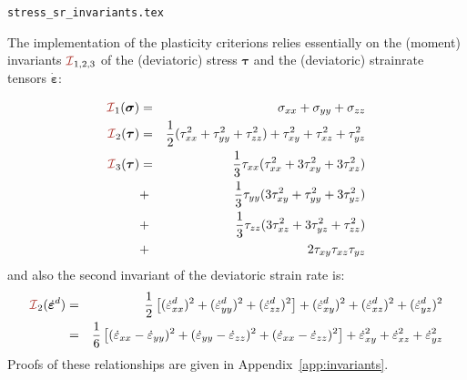 \begin{flushright} {\tiny {\color{gray} \tt stress\_sr\_invariants.tex}} \end{flushright}

The implementation of the plasticity criterions relies essentially 
on the (moment) invariants $\III_{1,2,3}$ of the (deviatoric) stress ${\bm \tau}$ 
and the (deviatoric) strainrate tensors $\dot{\bm \varepsilon}$:

\begin{eqnarray}
{\III}_1({\bm \sigma}) &=& \sigma_{xx}+\sigma_{yy}+\sigma_{zz}\\
{\III}_2({\bm \tau})   
&=&\frac{1}{2}(\tau_{xx}^2 + \tau_{yy}^2 + \tau_{zz}^2 ) + \tau_{xy}^2 + \tau_{xz}^2 + \tau_{yz}^2  \\
{\III}_3({\bm \tau}) 
&=& \frac{1}{3} \tau_{xx} (  \tau_{xx}^2 + 3 \tau_{xy}^2 + 3 \tau_{xz}^2  )     \nonumber\\
&+& \frac{1}{3} \tau_{yy} (3 \tau_{xy}^2 +   \tau_{yy}^2 + 3 \tau_{yz}^2  )     \nonumber\\
&+& \frac{1}{3} \tau_{zz} (3 \tau_{xz}^2 + 3 \tau_{yz}^2 +   \tau_{zz}^2)       \nonumber\\
&+& 2 \tau_{xy} \tau_{xz} \tau_{yz}  
\end{eqnarray}
and also the second invariant of the deviatoric strain rate is:
\begin{eqnarray}
{\III}_2(\dot{\bm{\varepsilon}}^d)
&=& \frac{1}{2} \left[ (\dot{\varepsilon}_{xx}^d)^2 + (\dot{\varepsilon}_{yy}^d)^2 + (\dot{\varepsilon}_{zz}^d)^2   \right] 
+ (\dot{\varepsilon}_{xy}^d)^2  
+ (\dot{\varepsilon}_{xz}^d)^2  
+ (\dot{\varepsilon}_{yz}^d)^2  \nonumber\\
&=& \frac{1}{6} \left[ (\dot{\varepsilon}_{xx}-\dot{\varepsilon}_{yy})^2 
+ (\dot{\varepsilon}_{yy}-\dot{\varepsilon}_{zz})^2 
+ (\dot{\varepsilon}_{xx}-\dot{\varepsilon}_{zz})^2 \right] 
+ \dot{\varepsilon}_{xy}^2 + \dot{\varepsilon}_{xz}^2 + \dot{\varepsilon}_{yz}^2 \label{eq:I2epsd} 
\end{eqnarray}
Proofs of these relationships are given in Appendix~\ref{app:invariants}.

